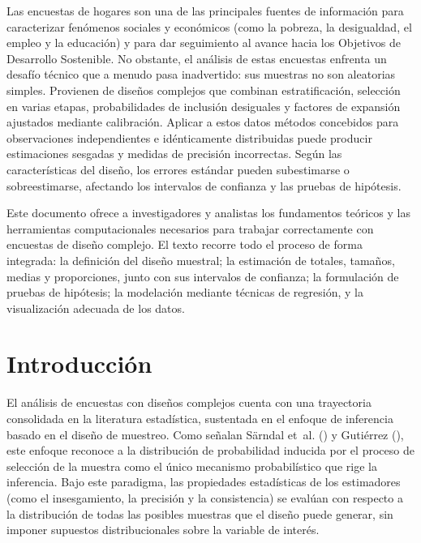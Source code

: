 \documentclass[
  spanish,
  11pt,
  letterpaper,
  oneside,
  open=any]{scrbook}
\begin{document}

Las encuestas de hogares son una de las principales fuentes de
información para caracterizar fenómenos sociales y económicos (como la
pobreza, la desigualdad, el empleo y la educación) y para dar
seguimiento al avance hacia los Objetivos de Desarrollo Sostenible. No
obstante, el análisis de estas encuestas enfrenta un desafío técnico que
a menudo pasa inadvertido: sus muestras no son aleatorias simples.
Provienen de diseños complejos que combinan estratificación, selección
en varias etapas, probabilidades de inclusión desiguales y factores de
expansión ajustados mediante calibración. Aplicar a estos datos métodos
concebidos para observaciones independientes e idénticamente
distribuidas puede producir estimaciones sesgadas y medidas de precisión
incorrectas. Según las características del diseño, los errores estándar
pueden subestimarse o sobreestimarse, afectando los intervalos de
confianza y las pruebas de hipótesis.

Este documento ofrece a investigadores y analistas los fundamentos
teóricos y las herramientas computacionales necesarios para trabajar
correctamente con encuestas de diseño complejo. El texto recorre todo el
proceso de forma integrada: la definición del diseño muestral; la
estimación de totales, tamaños, medias y proporciones, junto con sus
intervalos de confianza; la formulación de pruebas de hipótesis; la
modelación mediante técnicas de regresión, y la visualización adecuada
de los datos.


\chapter{Introducción}\label{cap1}

El análisis de encuestas con diseños complejos cuenta con una
trayectoria consolidada en la literatura estadística, sustentada en el
enfoque de inferencia basado en el diseño de muestreo. Como señalan
Särndal et~al. () y Gutiérrez
(), este enfoque reconoce a la
distribución de probabilidad inducida por el proceso de selección de la
muestra como el único mecanismo probabilístico que rige la inferencia.
Bajo este paradigma, las propiedades estadísticas de los estimadores
(como el insesgamiento, la precisión y la consistencia) se evalúan con
respecto a la distribución de todas las posibles muestras que el diseño
puede generar, sin imponer supuestos distribucionales sobre la variable
de interés.
\end{document}
